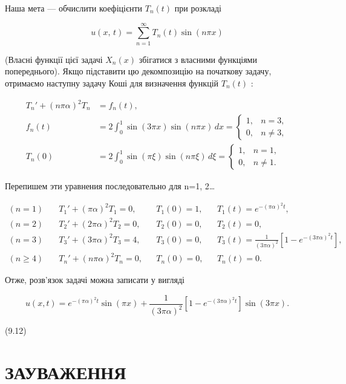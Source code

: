 \documentclass[
  ukrainian,
]{article}
\begin{document}
Наша мета --- обчислити коефіцієнти \(T_n(t)\) при розкладі

\[
u\left(x,\,t\right)=\sum_{n=1}^{\infty}T_n(t)\sin(n\pi x)
\]

(Власні функції цієї задачі \(X_n(x)\) збігатися з власними функціями
попереднього). Якщо підставити цю декомпозицію на початкову задачу,
отримаємо наступну задачу Коші для визначення функцій \(T_n(t)\) :

\[
\begin{aligned}
T_n' + (n\pi\alpha)^2 T_n &= f_n(t), \\
f_n(t) &= 2 \int_0^1 \sin(3\pi x)\sin(n\pi x)\,dx
= \begin{cases}
1, & n = 3, \\
0, & n \ne 3,
\end{cases} \\
T_n(0) &= 2 \int_0^1 \sin(\pi \xi)\sin(n\pi \xi)\,d\xi
= \begin{cases}
1, & n = 1, \\
0, & n \ne 1.
\end{cases}
\end{aligned}
\]

Перепишем эти уравнения последовательно для n=1, 2\ldots{}

\[
\begin{aligned}
(n=1)\quad & T_1' + (\pi\alpha)^2 T_1 = 0, && T_1(0) = 1, && T_1(t) = e^{-(\pi\alpha)^2 t}, \\
(n=2)\quad & T_2' + (2\pi\alpha)^2 T_2 = 0, && T_2(0) = 0, && T_2(t) = 0, \\
(n=3)\quad & T_3' + (3\pi\alpha)^2 T_3 = 4, && T_3(0) = 0, && T_3(t) = \frac{1}{(3\pi\alpha)^2}\left[1 - e^{-(3\pi\alpha)^2 t}\right], \\
(n\geqslant 4)\quad & T_n' + (n\pi\alpha)^2 T_n = 0, && T_n(0) = 0, && T_n(t) = 0.
\end{aligned}
\]

Отже, розв'язок задачі можна записати у вигляді

\[u(x, t) = e^{-(\pi\alpha)^2 t} \sin(\pi x) + \frac{1}{(3\pi\alpha)^2} [1 - e^{-(3\pi\alpha)^2 t}] \sin(3\pi x).\]

(9.12)

\section{ЗАУВАЖЕННЯ}\label{ux437ux430ux443ux432ux430ux436ux435ux43dux43dux44f-6}
\end{document}
